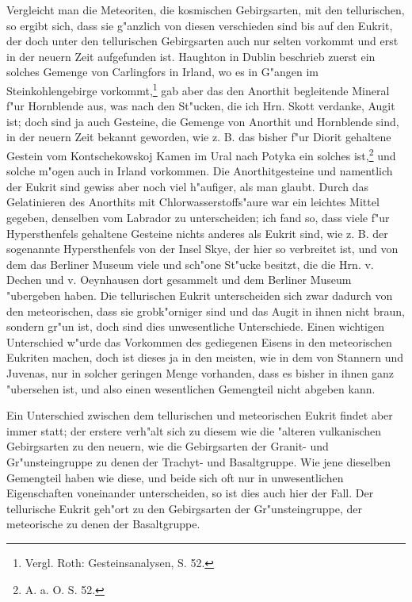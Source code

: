 \documentclass[a4paper, 11pt, oneside]{article}
\begin{document}
Vergleicht man die Meteoriten, die kosmischen Gebirgsarten, mit den tellurischen, so ergibt sich, dass sie g"anzlich von diesen verschieden sind bis auf den Eukrit, der doch unter den tellurischen Gebirgsarten auch nur selten vorkommt und erst in der neuern Zeit aufgefunden ist. Haughton in Dublin beschrieb zuerst ein solches Gemenge von Carlingfors in Irland, wo es in G"angen im Steinkohlengebirge vorkommt,\footnote{Vergl. Roth: Gesteinsanalysen, S. 52.} gab aber das den Anorthit begleitende Mineral f"ur Hornblende aus, was nach den St"ucken, die ich Hrn. Skott verdanke, Augit ist; doch sind ja auch Gesteine, die Gemenge von Anorthit und Hornblende sind, in der neuern Zeit bekannt geworden, wie z. B. das bisher f"ur Diorit gehaltene Gestein vom Kontschekowskoj Kamen im Ural nach Potyka ein solches ist,\footnote{A. a. O. S. 52.} und solche m"ogen auch in Irland vorkommen. Die Anorthitgesteine und namentlich der Eukrit sind gewiss aber noch viel h"aufiger, als man glaubt. Durch das Gelatinieren des Anorthits mit Chlorwasserstoffs"aure war ein leichtes Mittel gegeben, denselben vom Labrador zu unterscheiden; ich fand so, dass viele f"ur Hypersthenfels gehaltene Gesteine nichts anderes als Eukrit sind, wie z. B. der sogenannte Hypersthenfels von der Insel Skye, der hier so verbreitet ist, und von dem das Berliner Museum viele und sch"one St"ucke besitzt, die die Hrn. v. Dechen und v. Oeynhausen dort gesammelt und dem Berliner Museum "ubergeben haben. Die tellurischen Eukrit unterscheiden sich zwar dadurch von den meteorischen, dass sie grobk"orniger sind und das Augit in ihnen nicht braun, sondern gr"un ist, doch sind dies unwesentliche Unterschiede. Einen wichtigen Unterschied w"urde das Vorkommen des gediegenen Eisens in den meteorischen Eukriten machen, doch ist dieses ja in den meisten, wie in dem von Stannern und Juvenas, nur in solcher geringen Menge vorhanden, dass es bisher in ihnen ganz "ubersehen ist, und also einen wesentlichen Gemengteil nicht abgeben kann.

Ein Unterschied zwischen dem tellurischen und meteorischen Eukrit findet aber immer statt; der erstere verh"alt sich zu diesem wie die "alteren vulkanischen Gebirgsarten zu den neuern, wie die Gebirgsarten der Granit- und Gr"unsteingruppe zu denen der Trachyt- und Basaltgruppe. Wie jene dieselben Gemengteil haben wie diese, und beide sich oft nur in unwesentlichen Eigenschaften voneinander unterscheiden, so ist dies auch hier der Fall. Der tellurische Eukrit geh"ort zu den Gebirgsarten der Gr"unsteingruppe, der meteorische zu denen der Basaltgruppe.
\end{document}
